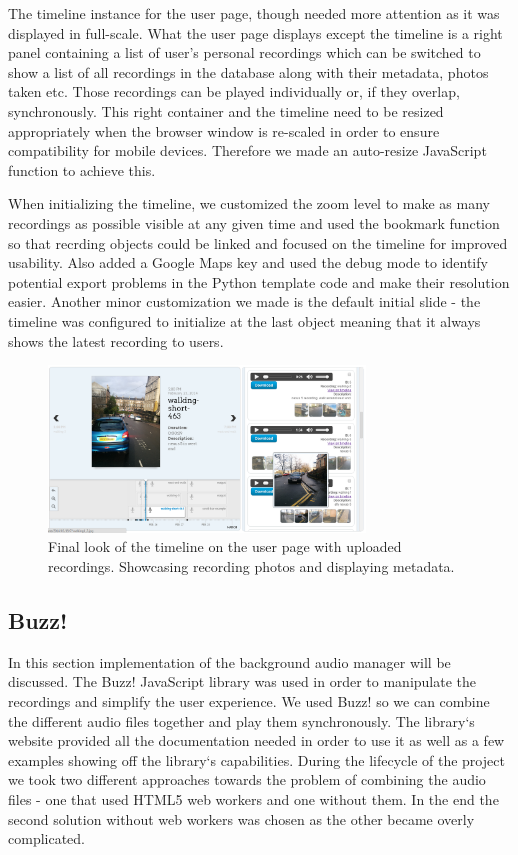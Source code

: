 \documentclass{l3proj}
\begin{document}
The timeline instance for the user page, though needed more attention as it was displayed in full-scale. What the user page displays except the timeline is a right panel containing a list of user's personal recordings which can be switched to show a list of all recordings in the database along with their metadata, photos taken etc.
Those recordings can be played individually or, if they overlap, synchronously. This right container and the timeline need to be resized appropriately when the browser window is re-scaled in order to ensure compatibility for mobile devices.
Therefore we made an auto-resize JavaScript function to achieve this.

When initializing the timeline, we customized the zoom level to make as many recordings as possible visible at any given time and used the bookmark function so that recrding objects could be linked and focused on the timeline for improved usability.
Also added a Google Maps key and used the debug mode to identify potential export problems in the Python template code and make their resolution easier. Another minor customization we made is the default initial slide - the timeline was configured to initialize at the last object meaning that it always shows the latest recording to users.

\begin{figure}[ht!]
  \centering
\includegraphics[width=0.75\textwidth]{images/timeline_final.png}
\caption{Final look of the timeline on the user page with uploaded recordings. Showcasing recording photos and displaying metadata.}
\end{figure}

\subsection{Buzz!}
In this section implementation of the background audio manager will be discussed. The Buzz! JavaScript library was used in order to manipulate the recordings and simplify the user experience. We used Buzz! so we can combine the different audio files together and play them synchronously. The library`s website provided all the documentation needed in order to use it as well as a few examples showing off the library`s capabilities. During the lifecycle of the project we took two different approaches towards the problem of combining the audio files - one that used HTML5 web workers and one without them. In the end the second solution without web workers was chosen as the other became overly complicated.
\end{document}
